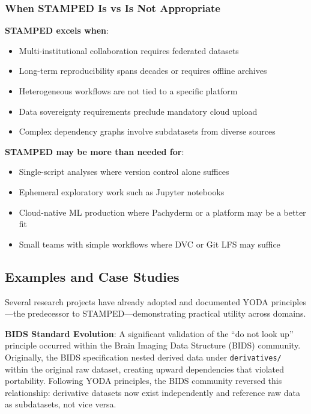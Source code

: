 \documentclass{article}
\begin{document}
\subsubsection{When STAMPED Is vs Is Not Appropriate}

\textbf{STAMPED excels when}:
\begin{itemize}
    \item Multi-institutional collaboration requires federated datasets
    \item Long-term reproducibility spans decades or requires offline archives
    \item Heterogeneous workflows are not tied to a specific platform
    \item Data sovereignty requirements preclude mandatory cloud upload
    \item Complex dependency graphs involve subdatasets from diverse sources
\end{itemize}

\textbf{STAMPED may be more than needed for}:
\begin{itemize}
    \item Single-script analyses where version control alone suffices
    \item Ephemeral exploratory work such as Jupyter notebooks
    \item Cloud-native ML production where Pachyderm or a platform may be a better fit
    \item Small teams with simple workflows where DVC or Git LFS may suffice
\end{itemize}

\subsection{Examples and Case Studies}

Several research projects have already adopted and documented YODA principles---the predecessor to STAMPED---demonstrating practical utility across domains.

\textbf{BIDS Standard Evolution}: A significant validation of the ``do not look up'' principle occurred within the Brain Imaging Data Structure (BIDS)\cite{gorgolewski_brain_2016} community.
Originally, the BIDS specification nested derived data under \texttt{derivatives/} within the original raw dataset, creating upward dependencies that violated portability.
Following YODA principles, the BIDS community reversed this relationship: derivative datasets now exist independently and reference raw data as subdatasets, not vice versa.
\end{document}
